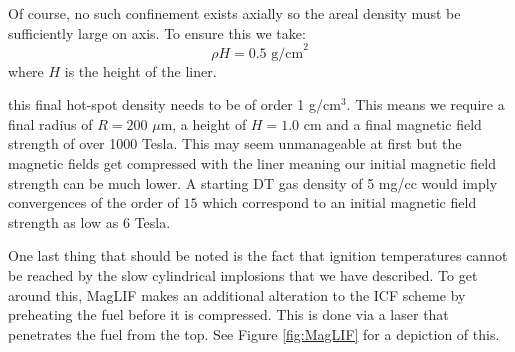 	Of course, no such confinement exists axially so the areal density must be sufficiently large on axis. To ensure this we take:
	\begin{equation}
		\rho H = 0.5 \text{ g/cm}^2
	\end{equation}
	where $H$ is the height of the liner.  
	
	 this final hot-spot density needs to be of order 1 g/cm$^3$. This means we require a final radius of $R=200$ $\mu$m, a height of $H=1.0$ cm and a final magnetic field strength of over 1000 Tesla. This may seem unmanageable at first but the magnetic fields get compressed with the liner meaning our initial magnetic field strength can be much lower. A starting DT gas density of 5 mg/cc would imply convergences of the order of $15$ which correspond to an initial magnetic field strength as low as 6 Tesla. 
	
	One last thing that should be noted is the fact that ignition temperatures cannot be reached by the slow cylindrical implosions that we have described. To get around this, MagLIF makes an additional alteration to the ICF scheme by preheating the fuel before it is compressed. This is done via a laser that penetrates the fuel from the top. See Figure \ref{fig:MagLIF} for a depiction of this.
	
	
	
	

	